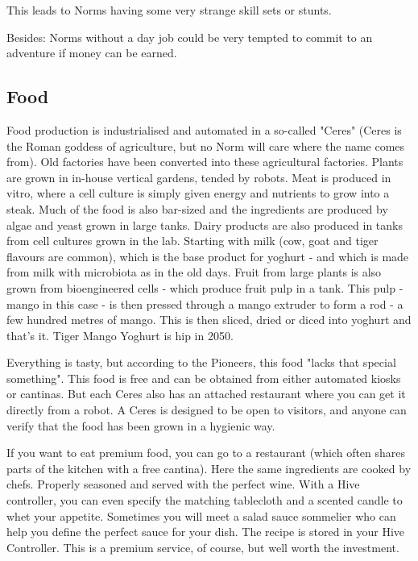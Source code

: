 This leads to Norms having some very strange skill sets or stunts.

Besides: Norms without a day job could be very tempted to commit to an adventure if money can be earned.

\subsection{Food}
\label{sec: norm food}

Food production is industrialised and automated in a so-called "Ceres" (Ceres is the Roman goddess of agriculture, but no Norm will care where the name comes from). Old factories have been converted into these agricultural factories. Plants are grown in in-house vertical gardens, tended by robots.
Meat is produced in vitro, where a cell culture is simply given energy and nutrients to grow into a steak. Much of the food is also bar-sized and the ingredients are produced by algae and yeast grown in large tanks.
Dairy products are also produced in tanks from cell cultures grown in the lab. Starting with milk (cow, goat and tiger flavours are common), which is the base product for yoghurt - and which is made from milk with microbiota as in the old days.
Fruit from large plants is also grown from bioengineered cells - which produce fruit pulp in a tank. This pulp - mango in this case - is then pressed through a mango extruder to form a rod - a few hundred metres of mango. This is then sliced, dried or diced into yoghurt and that's it. Tiger Mango Yoghurt is hip in 2050.

Everything is tasty, but according to the Pioneers, this food "lacks that special something".
This food is free and can be obtained from either automated kiosks or cantinas. But each Ceres also has an attached restaurant where you can get it directly from a robot. A Ceres is designed to be open to visitors, and anyone can verify that the food has been grown in a hygienic way.

If you want to eat premium food, you can go to a restaurant (which often shares parts of the kitchen with a free cantina). Here the same ingredients are cooked by chefs. Properly seasoned and served with the perfect wine. With a Hive controller, you can even specify the matching tablecloth and a scented candle to whet your appetite.
Sometimes you will meet a salad sauce sommelier who can help you define the perfect sauce for your dish. The recipe is stored in your Hive Controller. This is a premium service, of course, but well worth the investment.

